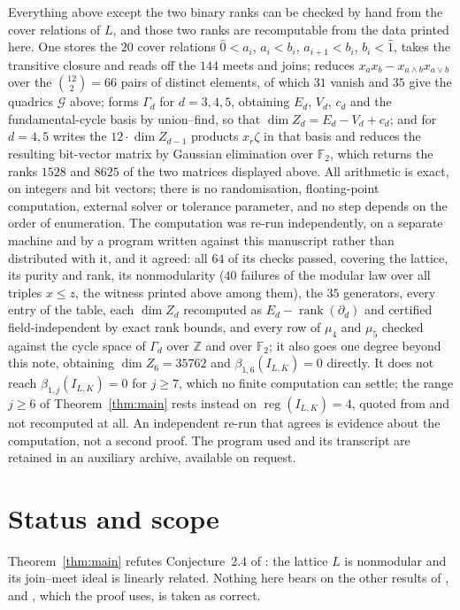 \documentclass[11pt]{amsart}
\begin{document}
Everything above except the two binary ranks can be checked by hand from
the cover relations of $L$, and those two ranks are recomputable from the
data printed here. One stores the $20$ cover relations $\widehat0<a_i$,
$a_i<b_i$, $a_{i+1}<b_i$, $b_i<\widehat1$, takes the transitive closure
and reads off the $144$ meets and joins; reduces
$x_ax_b-x_{a\wedge b}x_{a\vee b}$ over the $\binom{12}{2}=66$ pairs of
distinct elements, of which $31$ vanish and $35$ give the quadrics
$\mathcal G$ above; forms $\Gamma_d$ for $d=3,4,5$, obtaining $E_d$,
$V_d$, $c_d$ and the fundamental-cycle basis by union--find, so that
$\dim Z_d=E_d-V_d+c_d$; and for $d=4,5$ writes the $12\cdot\dim Z_{d-1}$
products $x_r\zeta$ in that basis and reduces the resulting bit-vector
matrix by Gaussian elimination over $\mathbb F_2$, which returns the
ranks $1528$ and $8625$ of the two matrices displayed above. All
arithmetic is exact, on integers and bit vectors; there is no
randomisation, floating-point computation, external solver or tolerance
parameter, and no step depends on the order of enumeration. The
computation was re-run independently, on a separate machine and by a
program written against this manuscript rather than distributed with it,
and it agreed: all $64$ of its checks passed, covering the lattice, its
purity and rank, its nonmodularity ($40$ failures of the modular law over
all triples $x\le z$, the witness printed above among them), the $35$
generators, every entry of the table, each $\dim Z_d$ recomputed as
$E_d-\operatorname{rank}(\partial_d)$ and certified field-independent by
exact rank bounds, and every row of $\mu_4$ and $\mu_5$ checked against
the cycle space of $\Gamma_d$ over $\mathbb Z$ and over $\mathbb F_2$; it
also goes one degree beyond this note, obtaining $\dim Z_6=35762$ and
$\beta_{1,6}(I_{L,K})=0$ directly. It does not reach
$\beta_{1,j}(I_{L,K})=0$ for $j\ge7$, which no finite computation can
settle; the range $j\ge6$ of Theorem~\ref{thm:main} rests instead on
$\operatorname{reg}(I_{L,K})=4$, quoted from \cite[Lemma~2.8]{HSF} and
not recomputed at all. An independent re-run that agrees is evidence
about the computation, not a second proof. The program used and its
transcript are retained in an auxiliary archive, available on request.

\section{Status and scope}

Theorem~\ref{thm:main} refutes Conjecture~2.4 of \cite{HSF}: the lattice
$L$ is nonmodular and its join--meet ideal is linearly related. Nothing
here bears on the other results of \cite{HSF}, and
\cite[Lemma~2.8]{HSF}, which the proof uses, is taken as correct.
\end{document}

